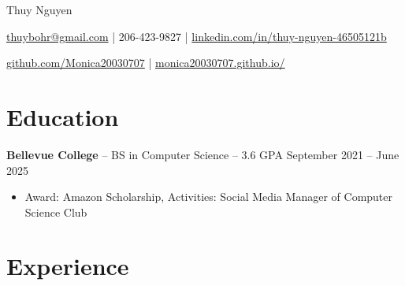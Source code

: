 \documentclass[11pt]{article}       %
\begin{document}
\centerline{\Huge Thuy Nguyen}

\vspace{5pt}

\centerline{\href{mailto:thuybohr@gmail.com}{thuybohr@gmail.com} | 206-423-9827 |
\href{https://www.linkedin.com/in/thuy-nguyen-46505121b/}{linkedin.com/in/thuy-nguyen-46505121b}}

\centerline{\href{https://github.com/Monica20030707}{github.com/Monica20030707} | 
\href{https://monica20030707.github.io/}{monica20030707.github.io/}} 

\vspace{-9pt}

\section*{Education}
\textbf{Bellevue College} -- BS in Computer Science -- 3.6 GPA \hfill September 2021 -- June 2025\\
\vspace{-9pt}
\begin{itemize}
  \item Award: Amazon Scholarship, Activities: Social Media Manager of Computer Science Club
\end{itemize}

\vspace{-18.5pt}

\section*{Experience}

\end{document}
